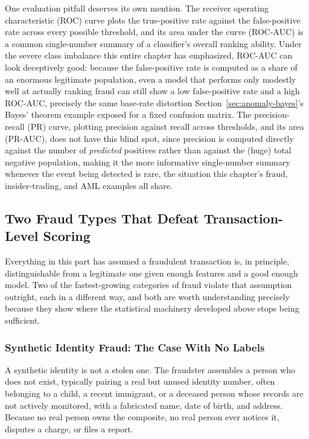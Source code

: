 \documentclass[../ai_in_finance]{subfiles}
\begin{document}
One evaluation pitfall deserves its own mention. The receiver operating characteristic (ROC) curve plots the true-positive rate against the false-positive rate across every possible threshold, and its area under the curve (ROC-AUC) is a common single-number summary of a classifier's overall ranking ability. Under the severe class imbalance this entire chapter has emphasized, ROC-AUC can look deceptively good: because the false-positive rate is computed as a share of an enormous legitimate population, even a model that performs only modestly well at actually ranking fraud can still show a low false-positive rate and a high ROC-AUC, precisely the same base-rate distortion Section~\ref{sec:anomaly-bayes}'s Bayes' theorem example exposed for a fixed confusion matrix. The precision-recall (PR) curve, plotting precision against recall across thresholds, and its area (PR-AUC), does not have this blind spot, since precision is computed directly against the number of \emph{predicted} positives rather than against the (huge) total negative population, making it the more informative single-number summary whenever the event being detected is rare, the situation this chapter's fraud, insider-trading, and AML examples all share.

\subsection{Two Fraud Types That Defeat Transaction-Level Scoring}
\label{sec:new-fraud-types}

Everything in this part has assumed a fraudulent transaction is, in principle, distinguishable from a legitimate one given enough features and a good enough model. Two of the fastest-growing categories of fraud violate that assumption outright, each in a different way, and both are worth understanding precisely because they show where the statistical machinery developed above stops being sufficient.

\subsubsection*{Synthetic Identity Fraud: The Case With No Labels}

A synthetic identity is not a stolen one. The fraudster assembles a person who does not exist, typically pairing a real but unused identity number, often belonging to a child, a recent immigrant, or a deceased person whose records are not actively monitored, with a fabricated name, date of birth, and address. Because no real person owns the composite, no real person ever notices it, disputes a charge, or files a report.
\end{document}
